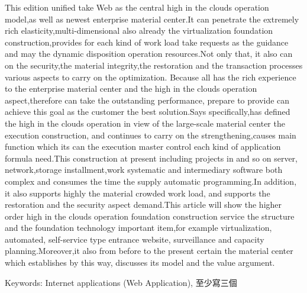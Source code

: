    This edition unified take Web as the central high in the clouds operation model,as well as newest enterprise material center.It can penetrate the extremely rich elasticity,multi-dimensional also already the virtualization foundation construction,provides for each kind of work load take requests as the guidance and may the dynamic disposition operation resources.Not only that, it also can on the security,the material integrity,the restoration and the transaction processes various aspects to carry on the optimization. Because all has the rich experience to the enterprise material center and the high in the clouds operation aspect,therefore can take the outstanding performance, prepare to provide can achieve this goal as the customer the best solution.Says specifically,has defined the high in the clouds operation in view of the large-scale material center the execution construction, and continues to carry on the strengthening,causes main function which its can  the execution master control each kind of application formula need.This construction at present including projects in and so on server, network,storage installment,work systematic and intermediary software both complex and consumes the time the supply automatic programming.In addition, it also supports highly the material crowded work load, and supports the restoration and the security aspect demand.This article will show the higher order high in the clouds operation foundation construction service the structure and the foundation technology important item,for example virtualization, automated, self-service type entrance website, surveillance and capacity planning.Moreover,it also from before to the present certain the material center which establishes by this way, discusses its model and the value argument.

Keywords: Internet applications (Web Application), 至少寫三個
